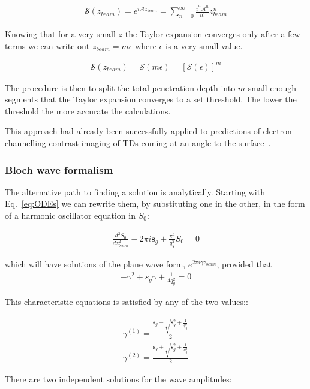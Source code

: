 \begin{align}
\mathcal{S}(z_{beam})=e^{i\mathcal{A} z_{beam}}= \sum_{n=0}^{\infty}\frac{i^n\mathcal{A}^n}{n!}z_{beam}^n
\end{align}

Knowing that for a very small $z$ the Taylor expansion converges only after a few terms we can write out $z_{beam}=m\epsilon$ where $\epsilon$ is a very small value.

\begin{align}
\mathcal{S}(z_{beam})=\mathcal{S}(m\epsilon)=\left[ \mathcal{S}(\epsilon) \right]^m
\end{align}

The procedure is then to split the total penetration depth into $m$ small enough segments that the Taylor expansion converges to a set threshold. The lower the threshold the more accurate the calculations. 

This approach had already been successfully applied to predictions of electron channelling contrast imaging of TDs coming at an angle to the surface~\cite{Picard14}.


\subsubsection{Bloch wave formalism}

The alternative path to finding a solution is analytically. Starting with Eq.~\ref{eq:ODEs} we can rewrite them, by substituting one in the other, in the form of a harmonic oscillator equation in $S_0$:

\begin{align}
\frac{d^2S_0}{dz_{beam}^2} -2\pi i \textbf{s}_g + \frac{\pi^2}{q_g^2}S_0=0
\end{align}

which will have solutions of the plane wave form, $e^{2 \pi i \gamma z_{beam}} $, provided that
\begin{align*}
-\gamma^2 + s_g \gamma + \frac{1}{4q_g^2}=0
\end{align*}

This characteristic equations is satisfied by any of the two values::

\begin{align*}
\gamma^{(1)} = \frac{\textbf{s}_g-\sqrt{\textbf{s}_g^2+\frac{1}{q_g^2}}}{2}\\
\gamma^{(2)} = \frac{\textbf{s}_g+\sqrt{\textbf{s}_g^2+\frac{1}{q_g^2}}}{2}
\end{align*}

There are two independent solutions for the wave amplitudes:


